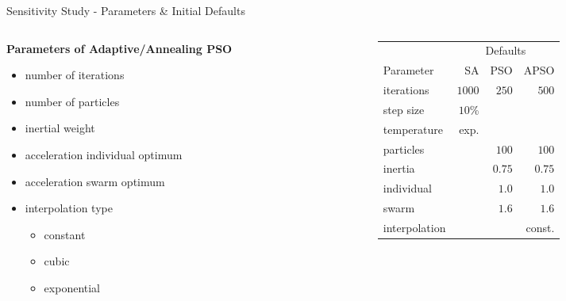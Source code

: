\documentclass[11pt,aspectratio=169]{beamer}
\begin{document}
\begin{frame}[fragile]{Sensitivity Study - Parameters \& Initial Defaults}

    \begin{columns}
    \begin{column}{0.5\textwidth}
        \textbf{Parameters of Adaptive/Annealing PSO}
        \begin{itemize}
            \item number of iterations
            \item number of particles
            \item inertial weight
            \item acceleration individual optimum
            \item acceleration swarm optimum
            \item interpolation type
                \begin{itemize}
                    \item constant
                    \item cubic
                    \item exponential
                \end{itemize}
        \end{itemize}
    \end{column}

    \begin{column}{0.5\textwidth}
        \begin{center}
            \begin{tabular}{@{}lrrr@{}}
                \toprule
                & \multicolumn{3}{c}{Defaults}       \\
                \cmidrule(r){2-4}Parameter & SA & PSO & APSO\\
                \midrule
                iterations    & $1000$ &  $250$ &  $500$ \\
                step size     & $10$\% &        &        \\
                temperature   &   exp. &        &        \\
                particles     &        &  $100$ &  $100$ \\
                inertia       &        & $0.75$ & $0.75$ \\
                individual    &        &  $1.0$ &  $1.0$ \\
                swarm         &        &  $1.6$ &  $1.6$ \\
                interpolation &        &        & const. \\
                \bottomrule
            \end{tabular}
        \end{center}
    \end{column}
    \end{columns}

\end{frame}
%
%
\end{document}
